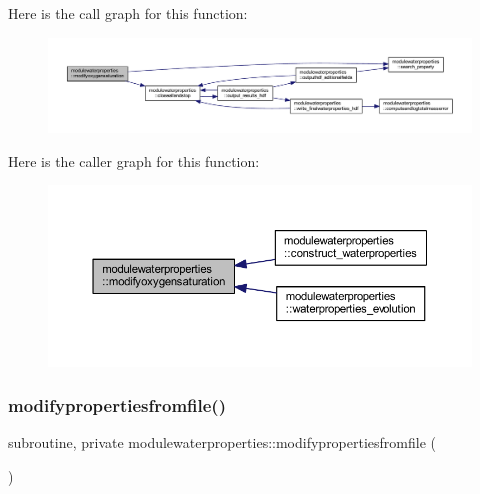 Here is the call graph for this function\+:\nopagebreak
\begin{figure}[H]
\begin{center}
\leavevmode
\includegraphics[width=350pt]{namespacemodulewaterproperties_a44ca5a1d937416e29607a7effa0209d5_cgraph}
\end{center}
\end{figure}
Here is the caller graph for this function\+:\nopagebreak
\begin{figure}[H]
\begin{center}
\leavevmode
\includegraphics[width=350pt]{namespacemodulewaterproperties_a44ca5a1d937416e29607a7effa0209d5_icgraph}
\end{center}
\end{figure}
\mbox{\label{namespacemodulewaterproperties_a0b4d4f88a02be98e446a383c70ac8803}} 
\subsubsection{\texorpdfstring{modifypropertiesfromfile()}{modifypropertiesfromfile()}}
{\footnotesize\ttfamily subroutine, private modulewaterproperties\+::modifypropertiesfromfile (\begin{DoxyParamCaption}{ }\end{DoxyParamCaption})\hspace{0.3cm}{\ttfamily [private]}}

